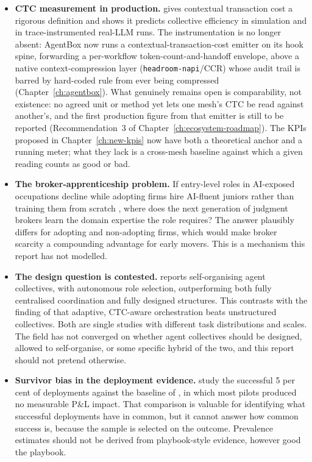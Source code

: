 \begin{itemize}
  \item \textbf{CTC measurement in production.} \textcite{Liu2026} gives contextual transaction cost a rigorous definition and shows it predicts collective efficiency in simulation and in trace-instrumented real-LLM runs. The instrumentation is no longer absent: AgentBox now runs a contextual-transaction-cost emitter on its hook spine, forwarding a per-workflow token-count-and-handoff envelope, above a native context-compression layer (\texttt{headroom-napi}/CCR) whose audit trail is barred by hard-coded rule from ever being compressed (Chapter~\ref{ch:agentbox}). What genuinely remains open is comparability, not existence: no agreed unit or method yet lets one mesh's CTC be read against another's, and the first production figure from that emitter is still to be reported (Recommendation~3 of Chapter~\ref{ch:ecosystem-roadmap}). The KPIs proposed in Chapter~\ref{ch:new-kpis} now have both a theoretical anchor and a running meter; what they lack is a cross-mesh baseline against which a given reading counts as good or bad.
  \item \textbf{The broker-apprenticeship problem.} If entry-level roles in AI-exposed occupations decline \parencite{Brynjolfsson2025Canaries} while adopting firms hire AI-fluent juniors rather than training them from scratch \parencite{RampRevelio2026}, where does the next generation of judgment brokers learn the domain expertise the role requires? The answer plausibly differs for adopting and non-adopting firms, which would make broker scarcity a compounding advantage for early movers. This is a mechanism this report has not modelled.
  \item \textbf{The design question is contested.} \textcite{Dochkina2026} reports self-organising agent collectives, with autonomous role selection, outperforming both fully centralised coordination and fully designed structures. This contrasts with the finding of \textcite{Liu2026} that adaptive, CTC-aware orchestration beats unstructured collectives. Both are single studies with different task distributions and scales. The field has not converged on whether agent collectives should be designed, allowed to self-organise, or some specific hybrid of the two, and this report should not pretend otherwise.
  \item \textbf{Survivor bias in the deployment evidence.} \textcite{Pereira2026Playbook} study the successful 5 per cent of deployments against the baseline of \textcite{MITNANDA2025}, in which most pilots produced no measurable P\&L impact. That comparison is valuable for identifying what successful deployments have in common, but it cannot answer how common success is, because the sample is selected on the outcome. Prevalence estimates should not be derived from playbook-style evidence, however good the playbook.

\end{itemize}
